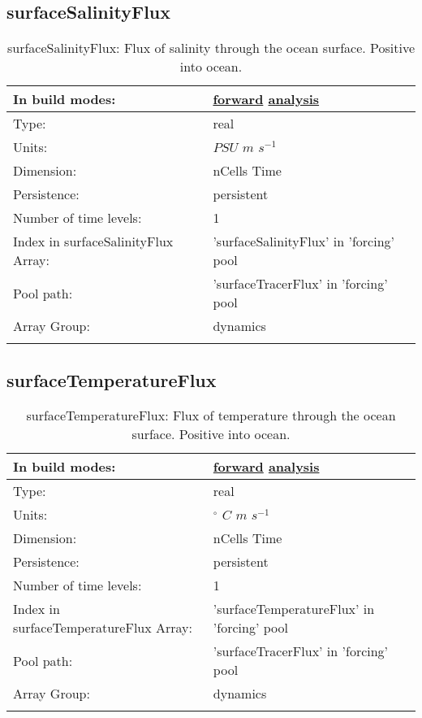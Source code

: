 \subsection[surfaceSalinityFlux]{surfaceSalinityFlux}
\label{subsec:var_sec_forcing_surfaceSalinityFlux}
\begin{center}
\begin{longtable}{| p{2.0in} | p{4.0in} |}
        \hline 
        In build modes: & \hyperref[subsec:forward_var_tab_forcing]{forward} \hyperref[subsec:analysis_var_tab_forcing]{analysis} \\
        \hline 
        Type: & real \\
        \hline 
        Units: & $PSU$ $m$ $s^{-1}$ \\
        \hline 
        Dimension: & nCells Time \\
        \hline 
        Persistence: & persistent \\
        \hline 
        Number of time levels: & 1 \\
        \hline 
		 Index in surfaceSalinityFlux Array: & 'surfaceSalinityFlux' in 'forcing' pool \\
		 \hline 
            Pool path: & 'surfaceTracerFlux' in 'forcing' pool
 \\
		 \hline 
		 Array Group: & dynamics \\
		 \hline 
    \caption{surfaceSalinityFlux: Flux of salinity through the ocean surface. Positive into ocean.}
\end{longtable}
\end{center}
\subsection[surfaceTemperatureFlux]{surfaceTemperatureFlux}
\label{subsec:var_sec_forcing_surfaceTemperatureFlux}
\begin{center}
\begin{longtable}{| p{2.0in} | p{4.0in} |}
        \hline 
        In build modes: & \hyperref[subsec:forward_var_tab_forcing]{forward} \hyperref[subsec:analysis_var_tab_forcing]{analysis} \\
        \hline 
        Type: & real \\
        \hline 
        Units: & $^\circ$ $C$ $m$ $s^{-1}$ \\
        \hline 
        Dimension: & nCells Time \\
        \hline 
        Persistence: & persistent \\
        \hline 
        Number of time levels: & 1 \\
        \hline 
		 Index in surfaceTemperatureFlux Array: & 'surfaceTemperatureFlux' in 'forcing' pool \\
		 \hline 
            Pool path: & 'surfaceTracerFlux' in 'forcing' pool
 \\
		 \hline 
		 Array Group: & dynamics \\
		 \hline 
    \caption{surfaceTemperatureFlux: Flux of temperature through the ocean surface. Positive into ocean.}
\end{longtable}
\end{center}
